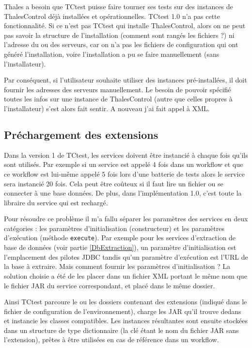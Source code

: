 Thales a besoin que TCtest puisse faire tourner ses tests sur des instances 
de ThalesControl déjà installées et opérationnelles. TCtest 1.0 n'a pas cette 
fonctionnalité. Si ce n'est pas TCtest qui installe ThalesControl, alors on 
ne peut pas savoir la structure de l'installation (comment sont rangés les 
fichiers ?) ni l'adresse du ou des serveurs, car on n'a pas les fichiers de 
configuration qui ont généré l'installation, voire l'installation a pu se faire 
manuellement (sans l'installateur).

Par conséquent, si l'utilisateur souhaite utiliser des instances pré-installées, 
il doit fournir les adresses des serveurs manuellement. Le besoin de pouvoir
spécifié toutes les infos sur une instance de ThalesControl (autre que celles 
propres à l'installateur) s'est alors fait sentir. A nouveau j'ai fait appel à 
XML.

\subsection{Préchargement des extensions}

Dans la version 1 de TCtest, les services doivent être instancié à chaque fois 
qu'ils sont utilisés. Par exemple si un service est appelé 4 fois dans un 
workflow et que ce workflow est lui-même appelé 5 fois lors d'une batterie de 
tests alors le service sera instancié 20 fois. Cela peut être coûteux si il 
faut lire un fichier ou se connecter à une base données. De plus, dans 
l'implémentation 1.0, c'est toute la libraire du service qui est rechargé.

Pour résoudre ce problème il m'a fallu séparer les paramètres des services
en deux catégories : les paramètres d'initialisation (constructeur) et les 
paramètres d'exécution (méthode \verb|execute|). Par exemple pour les services 
d'extraction de base de données (voir partie \ref{DbExtraction}), un paramètre 
d'initialisation est l'emplacement des pilotes JDBC tandis qu'un paramètre 
d'exécution est l'URL de la base à extraire. Mais comment fournir les paramètres
d'initialisation ? La solution choisie a été de les placer dans un fichier 
XML portant le même nom que le fichier JAR du service correspondant, et placé
dans le même dossier.

Ainsi TCtest parcoure le ou les dossiers contenant des extensions (indiqué 
dans le fichier de configuration de l'environnement), charge les JAR qu'il 
trouve dedans et instancie les classes compatibles. Les instances résultantes 
sont ensuite stockées dans un structure de type dictionnaire (la clé étant 
le nom du fichier JAR sans l'extension), prêtes à être utilisées en cas de 
référence dans un workflow.

